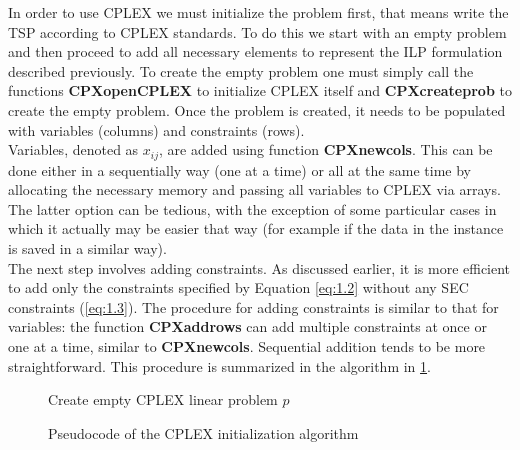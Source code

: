 In order to use CPLEX we must initialize the problem first, that means write the TSP according to CPLEX standards.
To do this we start with an empty problem and then proceed to add all necessary elements to represent the ILP formulation described previously.
To create the empty problem one must simply call the functions \textbf{CPXopenCPLEX} to initialize CPLEX itself and \textbf{CPXcreateprob} to create the empty problem.
Once the problem is created, it needs to be populated with variables (columns) and constraints (rows).\\
Variables, denoted as $x_{ij}$, are added using function \textbf{CPXnewcols}.
This can be done either in a sequentially way (one at a time) or all at the same time by allocating the necessary memory and passing all variables to CPLEX via arrays.
The latter option can be tedious, with the exception of some particular cases in which it actually may be easier that way (for example if the data in the instance is saved in a similar way).\\
The next step involves adding constraints. As discussed earlier, it is more efficient to add only the constraints specified by Equation \eqref{eq:1.2} without any SEC constraints (\eqref{eq:1.3}).
The procedure for adding constraints is similar to that for variables: the function \textbf{CPXaddrows} can add multiple constraints at once or one at a time, similar to \textbf{CPXnewcols}.
Sequential addition tends to be more straightforward.
This procedure is summarized in the algorithm in \figurename{ \ref{fig:CPLEXinit}}.

\begin{figure}[htbp]
	\begin{algorithm}[H]
		\vspace{2mm}
		Create empty CPLEX linear problem $p$\\
	\end{algorithm}
	\caption{Pseudocode of the CPLEX initialization algorithm}\label{fig:CPLEXinit}
\end{figure}

